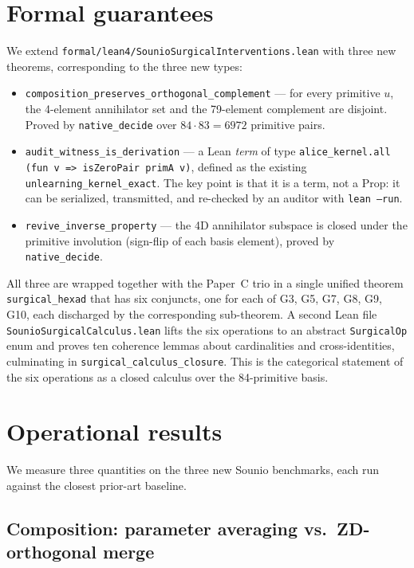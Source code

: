 \documentclass{article}
\begin{document}
\section{Formal guarantees}

We extend \texttt{formal/lean4/SounioSurgicalInterventions.lean} with
three new theorems, corresponding to the three new types:

\begin{itemize}
\item \texttt{composition\_preserves\_orthogonal\_complement} --- for
      every primitive $u$, the 4-element annihilator set and the
      79-element complement are disjoint.  Proved by \texttt{native\_decide}
      over $84 \cdot 83 = 6972$ primitive pairs.
\item \texttt{audit\_witness\_is\_derivation} --- a Lean \emph{term}
      of type \texttt{alice\_kernel.all (fun v => isZeroPair primA v)},
      defined as the existing \texttt{unlearning\_kernel\_exact}.  The
      key point is that it is a term, not a Prop: it can be serialized,
      transmitted, and re-checked by an auditor with \texttt{lean --run}.
\item \texttt{revive\_inverse\_property} --- the 4D annihilator subspace
      is closed under the primitive involution (sign-flip of each basis
      element), proved by \texttt{native\_decide}.
\end{itemize}

All three are wrapped together with the Paper~C trio in a single
unified theorem \texttt{surgical\_hexad} that has six conjuncts, one
for each of G3, G5, G7, G8, G9, G10, each discharged by the
corresponding sub-theorem.  A second Lean file
\texttt{SounioSurgicalCalculus.lean} lifts the six operations to an
abstract \texttt{SurgicalOp} enum and proves ten coherence lemmas
about cardinalities and cross-identities, culminating in
\texttt{surgical\_calculus\_closure}.  This is the categorical
statement of the six operations as a closed calculus over the
84-primitive basis.

\section{Operational results}

We measure three quantities on the three new Sounio benchmarks, each
run against the closest prior-art baseline.

\subsection{Composition: parameter averaging vs.\ ZD-orthogonal merge}
\end{document}
